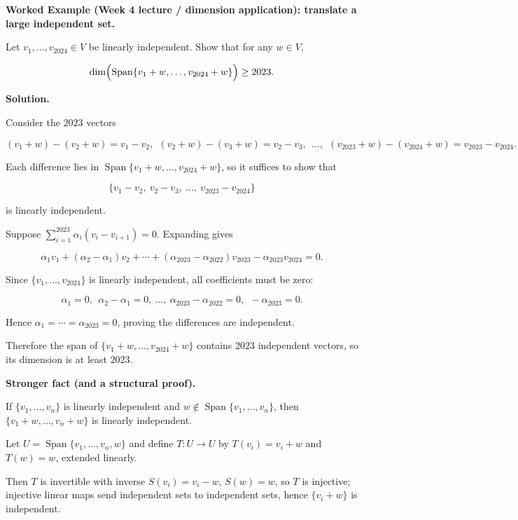 \begin{examplebox}

\textbf{Worked Example (Week 4 lecture / dimension application): translate a large independent set.}

Let $v_1,\ldots,v_{2024}\in V$ be linearly independent. Show that for any $w\in V$,

\[
\dim\Bigl(\operatorname{Span}\{v_1+w,\ldots,v_{2024}+w\}\Bigr)\ge 2023.
\]

\medskip

\textbf{Solution.}

Consider the $2023$ vectors

\[
(v_1+w)-(v_2+w)=v_1-v_2,\ \ (v_2+w)-(v_3+w)=v_2-v_3,\ \ \ldots,\ \ (v_{2023}+w)-(v_{2024}+w)=v_{2023}-v_{2024}.
\]

Each difference lies in $\operatorname{Span}\{v_1+w,\ldots,v_{2024}+w\}$, so it suffices to show that

\[
\{v_1-v_2,\ v_2-v_3,\ \ldots,\ v_{2023}-v_{2024}\}
\]

is linearly independent.

Suppose $\sum_{i=1}^{2023}\alpha_i (v_i-v_{i+1})=0$. Expanding gives

\[
\alpha_1 v_1+(\alpha_2-\alpha_1)v_2+\cdots+(\alpha_{2023}-\alpha_{2022})v_{2023}-\alpha_{2023}v_{2024}=0.
\]

Since $\{v_1,\ldots,v_{2024}\}$ is linearly independent, all coefficients must be zero:

\[
\alpha_1=0,\ \ \alpha_2-\alpha_1=0,\ \ldots,\ \alpha_{2023}-\alpha_{2022}=0,\ \ -\alpha_{2023}=0.
\]

Hence $\alpha_1=\cdots=\alpha_{2023}=0$, proving the differences are independent.

Therefore the span of $\{v_1+w,\ldots,v_{2024}+w\}$ contains $2023$ independent vectors, so its dimension is at least $2023$.

\end{examplebox}

\begin{extension}[title={Extension (Tutorial 3, Question 6, Method 2)}]

\textbf{Stronger fact (and a structural proof).}

If $\{v_1,\ldots,v_n\}$ is linearly independent and $w\notin\operatorname{Span}\{v_1,\ldots,v_n\}$, then $\{v_1+w,\ldots,v_n+w\}$ is linearly independent.

Let $U=\operatorname{Span}\{v_1,\ldots,v_n,w\}$ and define $T:U\to U$ by $T(v_i)=v_i+w$ and $T(w)=w$, extended linearly.

Then $T$ is invertible with inverse $S(v_i)=v_i-w$, $S(w)=w$, so $T$ is injective; injective linear maps send independent sets to independent sets, hence $\{v_i+w\}$ is independent.

\end{extension}

